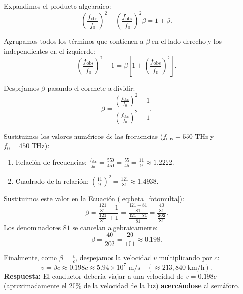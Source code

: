 \documentclass[11pt,a4paper]{book}
\begin{document}
\begin{itemize}
    Expandimos el producto algebraico:
    \begin{equation}
        \left(\frac{f_{\text{obs}}}{f_0}\right)^2 - \left(\frac{f_{\text{obs}}}{f_0}\right)^2 \beta = 1 + \beta.
    \end{equation}
    
    Agrupamos todos los términos que contienen a $\beta$ en el lado derecho y los independientes en el izquierdo:
    \begin{equation}
        \left(\frac{f_{\text{obs}}}{f_0}\right)^2 - 1 = \beta \left[ 1 + \left(\frac{f_{\text{obs}}}{f_0}\right)^2 \right].
    \end{equation}
    
    Despejamos $\beta$ pasando el corchete a dividir:
    \begin{equation}
        \beta = \frac{\left(\frac{f_{\text{obs}}}{f_0}\right)^2 - 1}{\left(\frac{f_{\text{obs}}}{f_0}\right)^2 + 1}.
        \label{eq:beta_fotomulta}
    \end{equation}
    
    Sustituimos los valores numéricos de las frecuencias ($f_{\text{obs}} = 550 \text{ THz}$ y $f_0 = 450 \text{ THz}$):
    \begin{enumerate}
        \item Relación de frecuencias: $\frac{f_{\text{obs}}}{f_0} = \frac{550}{450} = \frac{55}{45} = \frac{11}{9} \approx 1.2222$.
        \item Cuadrado de la relación: $\left(\frac{11}{9}\right)^2 = \frac{121}{81} \approx 1.4938$.
    \end{enumerate}
    Sustituimos este valor en la Ecuación (\ref{eq:beta_fotomulta}):
    \begin{equation}
        \beta = \frac{\frac{121}{81} - 1}{\frac{121}{81} + 1} = \frac{\frac{121 - 81}{81}}{\frac{121 + 81}{81}} = \frac{\frac{40}{81}}{\frac{202}{81}}.
    \end{equation}
    Los denominadores $81$ se cancelan algebraicamente:
    \begin{equation}
        \beta = \frac{40}{202} = \frac{20}{101} \approx 0.198.
    \end{equation}
    
    Finalmente, como $\beta = \frac{v}{c}$, despejamos la velocidad $v$ multiplicando por $c$:
    \begin{equation}
        v = \beta c \approx 0.198c \approx 5.94 \times 10^7 \text{ m/s} \quad (\approx 213,840 \text{ km/h}).
    \end{equation}
    \textbf{Respuesta:} El conductor debería viajar a una velocidad de $v = 0.198c$ (aproximadamente el $20\%$ de la velocidad de la luz) \textbf{acercándose} al semáforo.

    
\end{itemize}
\end{document}
